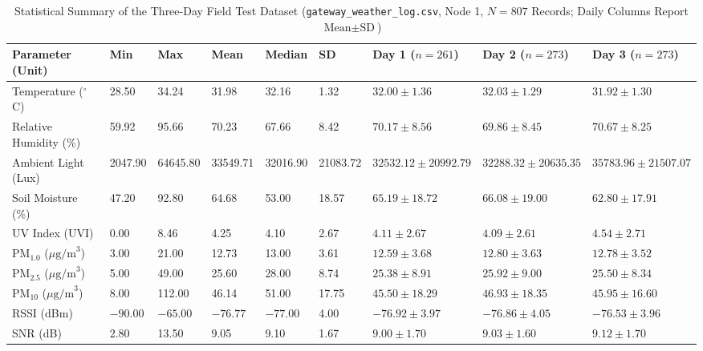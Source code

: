 \documentclass[conference,onecolumn]{IEEEtran}
\begin{document}
\begin{table}[!htbp]
\centering
\caption{Statistical Summary of the Three-Day Field Test Dataset (\texttt{gateway\_weather\_log.csv}, Node 1, $N = 807$ Records; Daily Columns Report $\text{Mean} \pm \text{SD}$)}
\label{tab:dataset}
\scriptsize
\setlength{\tabcolsep}{3.5pt}
\renewcommand{\arraystretch}{0.92}
\begin{tabularx}{\textwidth}{L{2.55cm} R{0.85cm} R{1.05cm} R{1.05cm} R{1.00cm} R{0.95cm} R{2.25cm} R{2.25cm} Y}
\toprule
\textbf{Parameter (Unit)} & \textbf{Min} & \textbf{Max} & \textbf{Mean} & \textbf{Median} & \textbf{SD} & \textbf{Day 1 ($n=261$)} & \textbf{Day 2 ($n=273$)} & \textbf{Day 3 ($n=273$)} \\
\midrule
Temperature ($^\circ$C) & 28.50 & 34.24 & 31.98 & 32.16 & 1.32 & $32.00 \pm 1.36$ & $32.03 \pm 1.29$ & $31.92 \pm 1.30$ \\
Relative Humidity (\%) & 59.92 & 95.66 & 70.23 & 67.66 & 8.42 & $70.17 \pm 8.56$ & $69.86 \pm 8.45$ & $70.67 \pm 8.25$ \\
Ambient Light (Lux) & 2047.90 & 64645.80 & 33549.71 & 32016.90 & 21083.72 & $32532.12 \pm 20992.79$ & $32288.32 \pm 20635.35$ & $35783.96 \pm 21507.07$ \\
Soil Moisture (\%) & 47.20 & 92.80 & 64.68 & 53.00 & 18.57 & $65.19 \pm 18.72$ & $66.08 \pm 19.00$ & $62.80 \pm 17.91$ \\
UV Index (UVI) & 0.00 & 8.46 & 4.25 & 4.10 & 2.67 & $4.11 \pm 2.67$ & $4.09 \pm 2.61$ & $4.54 \pm 2.71$ \\
PM$_{1.0}$ ($\mu\text{g/m}^3$) & 3.00 & 21.00 & 12.73 & 13.00 & 3.61 & $12.59 \pm 3.68$ & $12.80 \pm 3.63$ & $12.78 \pm 3.52$ \\
PM$_{2.5}$ ($\mu\text{g/m}^3$) & 5.00 & 49.00 & 25.60 & 28.00 & 8.74 & $25.38 \pm 8.91$ & $25.92 \pm 9.00$ & $25.50 \pm 8.34$ \\
PM$_{10}$ ($\mu\text{g/m}^3$) & 8.00 & 112.00 & 46.14 & 51.00 & 17.75 & $45.50 \pm 18.29$ & $46.93 \pm 18.35$ & $45.95 \pm 16.60$ \\
RSSI (dBm) & $-90.00$ & $-65.00$ & $-76.77$ & $-77.00$ & 4.00 & $-76.92 \pm 3.97$ & $-76.86 \pm 4.05$ & $-76.53 \pm 3.96$ \\
SNR (dB) & 2.80 & 13.50 & 9.05 & 9.10 & 1.67 & $9.00 \pm 1.70$ & $9.03 \pm 1.60$ & $9.12 \pm 1.70$ \\
\bottomrule
\end{tabularx}
\end{table}
\end{document}
